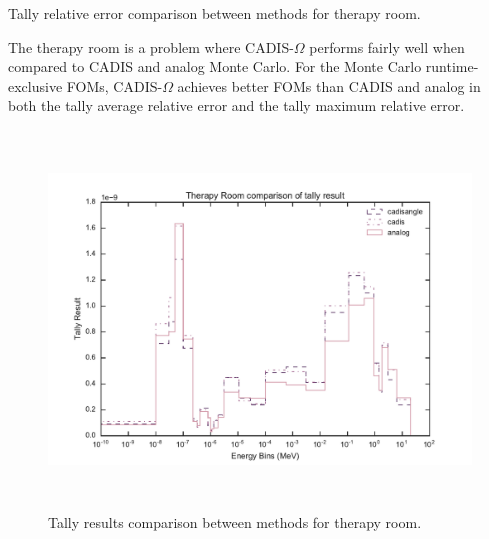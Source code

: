 \begin{table}[h!]
  \centering
  
  \caption[Tally results comparison between methods for 
  therapy room.]{Tally relative error comparison between methods for therapy room.}
  \label{tab:therapyfoms}
\end{table}

The therapy room is a problem where CADIS-$\Omega$ performs fairly well when
compared to CADIS and analog Monte Carlo. For the Monte Carlo
runtime-exclusive FOMs, CADIS-$\Omega$ achieves better FOMs than CADIS and 
analog in both the tally average relative error and the tally maximum
relative error.

\begin{figure}[h!]
  \centering
  \includegraphics[height=10cm]{./chapters/characterization_probs/figures/char/therapy/therapy_room_tally_result_compare.pdf}
  \caption[Tally results comparison between methods for 
  therapy room.]
  {Tally results comparison between methods for therapy room.}
  \label{fig:therapyresult}
\end{figure}

